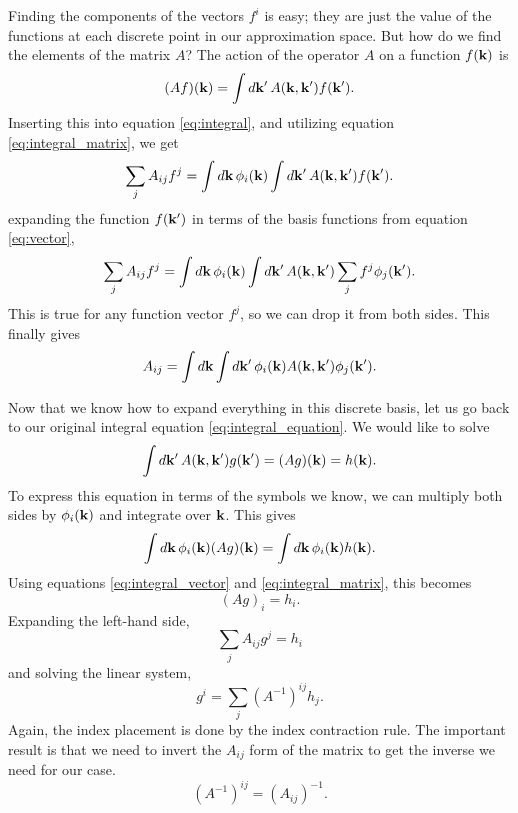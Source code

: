 \documentclass[12pt]{article}
\begin{document}
Finding the components of the vectors $f^i$ is easy; they are just the value of the functions at
each discrete point in our approximation space. But how do we find the elements of the matrix $A$?
The action of the operator $A$ on a function $f(\vb{k})$ is
\begin{equation}
    (Af)(\vb{k}) = \int\dd{\vb{k'}} A(\vb{k}, \vb{k'}) f(\vb{k'}).
\end{equation}
Inserting this into equation \eqref{eq:integral}, and utilizing equation \eqref{eq:integral_matrix},
we get
\begin{equation}
    \sum_j A_{ij} f^j = \int\dd{\vb{k}} \phi_i(\vb{k}) \int\dd{\vb{k'}} A(\vb{k}, \vb{k'}) f(\vb{k'}).
\end{equation}
expanding the function $f(\vb{k'})$ in terms of the basis functions from equation \eqref{eq:vector},
\begin{equation}
    \sum_j A_{ij} f^j = \int\dd{\vb{k}} \phi_i(\vb{k}) \int\dd{\vb{k'}} A(\vb{k}, \vb{k'})
    \sum_j f^j \phi_j(\vb{k'}).
\end{equation}
This is true for any function vector $f^j$, so we can drop it from both sides. This finally gives
\begin{equation}
    A_{ij} = \int\dd{\vb{k}} \int\dd{\vb{k'}} \phi_i(\vb{k}) A(\vb{k}, \vb{k'}) \phi_j(\vb{k'}).
    \label{eq:matrix_elements}
\end{equation}

Now that we know how to expand everything in this discrete basis, let us go back to our original
integral equation \eqref{eq:integral_equation}. We would like to solve
\begin{equation}
    \int \dd{\vb{k'}} A(\vb{k}, \vb{k'}) g(\vb{k'}) = (Ag)(\vb{k}) = h(\vb{k}).
\end{equation}
To express this equation in terms of the symbols we know, we can multiply both sides by
$\phi_i(\vb{k})$ and integrate over $\vb{k}$. This gives
\begin{equation}
    \int \dd{\vb{k}} \phi_i(\vb{k}) (Ag)(\vb{k}) = \int \dd{\vb{k}} \phi_i(\vb{k}) h(\vb{k}).
\end{equation}
Using equations \eqref{eq:integral_vector} and \eqref{eq:integral_matrix}, this becomes
\begin{equation}
    (Ag)_i = h_i.
\end{equation}
Expanding the left-hand side,
\begin{equation}
    \sum_j A_{ij} g^j = h_i
\end{equation}
and solving the linear system,
\begin{equation}
    g^i = \sum_j (A^{-1})^{ij} h_j.
    \label{eq:inverse}
\end{equation}
Again, the index placement is done by the index contraction rule. The important result is that
we need to invert the $A_{ij}$ form of the matrix to get the inverse we need for our case.
\begin{equation}
    (A^{-1})^{ij} = (A_{ij})^{-1}.
\end{equation}
\end{document}
